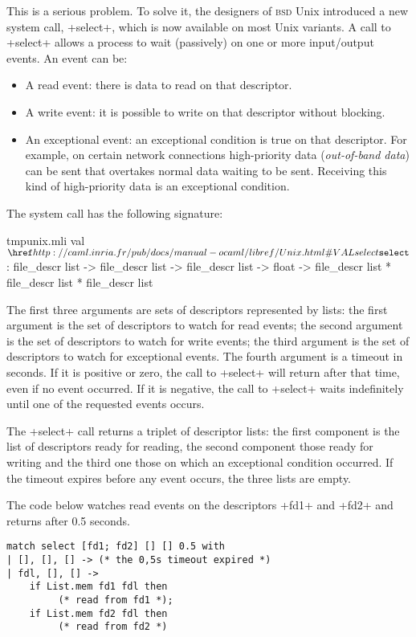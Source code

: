 This is a serious problem. To solve it, the designers of \textsc{bsd}
Unix introduced a new system call, \ml+select+, which is now
available on most Unix variants. A call to \ml+select+ allows a
process to wait (passively) on one or more input/output events.
An event can be:
%
\begin{itemize}
\item A read event: there is data to read on that descriptor.

\item A write event: it is possible to write on that descriptor
  without blocking.

\item An exceptional event: an exceptional condition is
  true on that descriptor. For example, on certain network connections
  high-priority data (\emph{out-of-band data}) can be sent that
  overtakes normal data waiting to be sent. Receiving this kind of 
  high-priority data is an exceptional condition.
\end{itemize}
%
The system call  has the following signature:
%
\begin{listingcodefile}{tmpunix.mli}
val $\libvalue{Unix}{select}$ : 
    file_descr list -> file_descr list -> file_descr list -> 
      float -> file_descr list * file_descr list * file_descr list
\end{listingcodefile}
%
The first three arguments are sets of descriptors represented by
lists: the first argument is the set of descriptors to watch for read
events; the second argument is the set of descriptors to watch for
write events; the third argument is the set of descriptors to watch
for exceptional events. The fourth argument is a timeout in
seconds. If it is positive or zero, the call to \ml+select+ will return
after that time, even if no event occurred. If it is negative, the call
to \ml+select+ waits indefinitely until one of the requested events occurs.

The \ml+select+ call returns a triplet of descriptor lists: the first
component is the list of descriptors ready for reading, the second
component those ready for writing and the third one those on which an
exceptional condition occurred. If the timeout expires before any
event occurs, the three lists are empty.

\begin{example} 
The code below watches read events on the descriptors \ml+fd1+ and 
\ml+fd2+ and returns after 0.5 seconds. 
\begin{lstlisting}
match select [fd1; fd2] [] [] 0.5 with
| [], [], [] -> (* the 0,5s timeout expired *)
| fdl, [], [] ->
    if List.mem fd1 fdl then
         (* read from fd1 *);
    if List.mem fd2 fdl then
         (* read from fd2 *)
\end{lstlisting}
\end{example}

